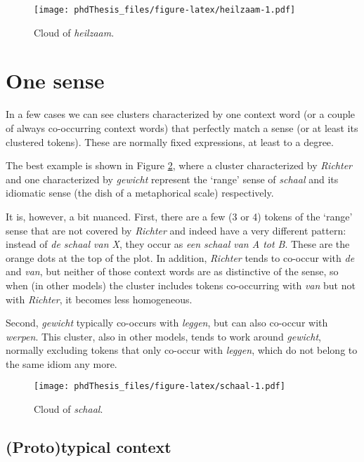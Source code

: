 \documentclass[
]{book}
\begin{document}
\begin{figure}
\centering
\texttt{[image: phdThesis\_files/figure-latex/heilzaam-1.pdf]}
\caption{\label{fig:heilzaam}Cloud of \emph{heilzaam}.}
\end{figure}

\hypertarget{one-sense}{%
\section{One sense}\label{one-sense}}

In a few cases we can see clusters characterized by one context word (or a couple of always co-occurring context words) that perfectly match a sense (or at least its clustered tokens). These are normally fixed expressions, at least to a degree.

The best example is shown in Figure \ref{fig:schaal}, where a cluster characterized by \emph{Richter} and one characterized by \emph{gewicht} represent the `range' sense of \emph{schaal} and its idiomatic sense (the dish of a metaphorical scale) respectively.

It is, however, a bit nuanced. First, there are a few (3 or 4) tokens of the `range' sense that are not covered by \emph{Richter} and indeed have a very different pattern: instead of \emph{de schaal van X}, they occur as \emph{een schaal van A tot B}. These are the orange dots at the top of the plot. In addition, \emph{Richter} tends to co-occur with \emph{de} and \emph{van}, but neither of those context words are as distinctive of the sense, so when (in other models) the cluster includes tokens co-occurring with \emph{van} but not with \emph{Richter}, it becomes less homogeneous.

Second, \emph{gewicht} typically co-occurs with \emph{leggen}, but can also co-occur with \emph{werpen}. This cluster, also in other models, tends to work around \emph{gewicht}, normally excluding tokens that only co-occur with \emph{leggen}, which do not belong to the same idiom any more.



\begin{figure}
\centering
\texttt{[image: phdThesis\_files/figure-latex/schaal-1.pdf]}
\caption{\label{fig:schaal}Cloud of \emph{schaal}.}
\end{figure}

\hypertarget{prototypical-context}{%
\subsection{(Proto)typical context}\label{prototypical-context}}
\end{document}
